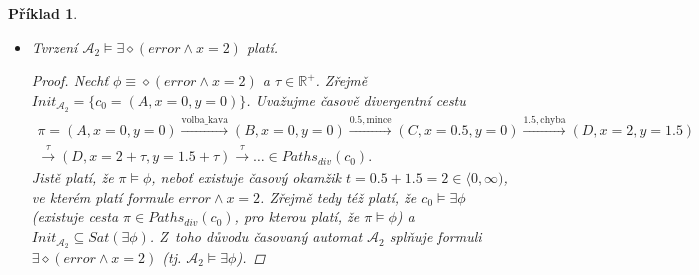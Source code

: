 \documentclass[a4paper]{article}
\let\pred\mathit
\theoremstyle{task}
\newtheorem{task}{Příklad}
\begin{document}
\begin{task}
\begin{itemize}
        \item Tvrzení $\mathcal{A}_2 \models \exists \diamond (\pred{error} \land x = 2)$ platí.

        \begin{proof}
            Nechť $\phi \equiv \diamond (\pred{error} \land x = 2)$ a $\tau \in \mathbb{R}^+$. Zřejmě $\mathit{Init}_{\mathcal{A}_2} = \{c_0 = (A, x = 0, y = 0)\}$. Uvažujme časově divergentní cestu
            \begin{multline*}
            \pi = (A, x = 0, y = 0) \xrightarrow{\text{volba\_kava}} (B, x = 0, y = 0) \xrightarrow{0.5, \text{mince}} (C, x = 0.5, y = 0) \xrightarrow{1.5, \text{chyba}} (D, x = 2, y = 1.5)\\
            \xrightarrow{\tau} (D, x = 2 + \tau, y = 1.5 + \tau) \xrightarrow{\tau} \dots \in \mathit{Paths}_\mathit{div}(c_0).
            \end{multline*}
            Jistě platí, že $\pi \models \phi$, neboť existuje časový okamžik $t = 0.5 + 1.5 = 2 \in \langle 0, \infty)$, ve kterém platí formule $\pred{error} \land x = 2$. Zřejmě tedy též platí, že $c_0 \models \exists \phi$ (existuje cesta $\pi \in \mathit{Paths}_\mathit{div}(c_0)$, pro kterou platí, že $\pi \models \phi$) a $\mathit{Init}_{\mathcal{A}_2} \subseteq \mathit{Sat(\exists \phi)}$. Z~toho důvodu časovaný automat $\mathcal{A}_2$ splňuje formuli $\exists \diamond (\pred{error} \land x = 2)$ (tj. $\mathcal{A}_2 \models \exists \phi$).
        \end{proof}


        
    \end{itemize}


    
\end{task}
\end{document}
